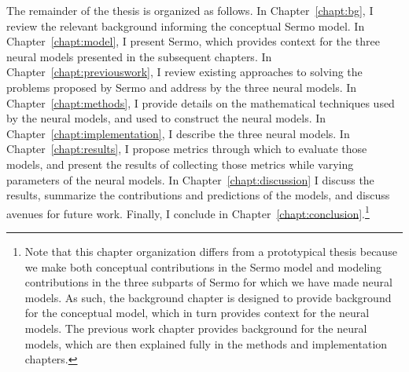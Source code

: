 The remainder of the thesis is organized as follows.
In Chapter~\ref{chapt:bg},
I review the relevant background informing
the conceptual Sermo model.
In Chapter~\ref{chapt:model},
I present Sermo,
which provides context for
the three neural models presented
in the subsequent chapters.
In Chapter~\ref{chapt:previouswork},
I review existing approaches
to solving the problems
proposed by Sermo
and address by the three neural models.
In Chapter~\ref{chapt:methods},
I provide details on the
mathematical techniques
used by the neural models,
and used to construct the neural models.
In Chapter~\ref{chapt:implementation},
I describe the three neural models.
In Chapter~\ref{chapt:results},
I propose metrics through which
to evaluate those models,
and present the results of collecting those metrics
while varying parameters of the neural models.
In Chapter~\ref{chapt:discussion}
I discuss the results,
summarize the contributions and predictions
of the models,
and discuss avenues for future work.
Finally, I conclude in Chapter~\ref{chapt:conclusion}.\footnote{
  Note that this chapter organization differs
  from a prototypical thesis
  because we make both
  conceptual contributions
  in the Sermo model
  and modeling contributions
  in the three subparts of Sermo
  for which we have made neural models.
  As such, the background chapter is designed
  to provide background for the conceptual model,
  which in turn provides context
  for the neural models.
  The previous work chapter provides
  background for the neural models,
  which are then explained fully
  in the methods and implementation chapters.}
